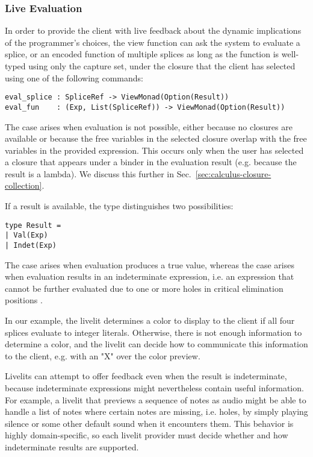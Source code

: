 \subsubsection{Live Evaluation}
\label{sec:live-evaluation-def}
In order to provide the client with live feedback about the dynamic implications 
of the programmer's choices, 
the view function can ask the system to evaluate a splice, or an encoded function of 
multiple splices as long as the function is well-typed using only the capture set, 
under the closure that the client has selected using one of the following
commands:
\begin{lstlisting}[numbers=none]
eval_splice : SpliceRef -> ViewMonad(Option(Result))
eval_fun    : (Exp, List(SpliceRef)) -> ViewMonad(Option(Result))
\end{lstlisting}

The  case 
arises when evaluation is not possible, either because no closures are available
or because the free variables in the selected closure overlap with the free 
variables in the provided expression. This occurs only when the user has selected
a closure that appears under a binder in the evaluation result (e.g. because 
the result is a lambda). 
We discuss this further in Sec.~\ref{sec:calculus-closure-collection}.

If a result is available, the  type distinguishes two possibilities:
\begin{lstlisting}[numbers=none]
type Result = 
| Val(Exp)
| Indet(Exp)
\end{lstlisting}
The  case arises when evaluation produces a true value, whereas the 
 case arises when evaluation results in an indeterminate expression,
i.e. an expression that cannot be further evaluated due to one or more holes 
in critical elimination positions \cite{HazelnutLive}.

In our example, the livelit determines a color to display to the client 
if all four splices evaluate to integer literals. Otherwise, there is not 
enough information to determine a color, and the livelit can decide how to 
communicate this information to the client, e.g. with an "X" over the color 
preview.

Livelits can attempt to offer feedback even when the result is indeterminate,
because indeterminate expressions might nevertheless contain useful information.
For example, a livelit that previews a sequence of notes as audio might be able 
to handle a list of notes where certain notes are missing, i.e. holes, by 
simply playing silence or some other default sound when it encounters them.
This behavior is highly domain-specific, so each livelit provider must decide 
whether and how indeterminate results are supported.

